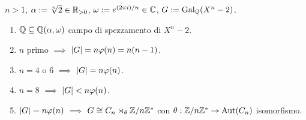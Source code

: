 \begin{eser}
$n>1$, $\alpha:=\sqrt[n]{2}\in\R_{>0}$, $\omega:=e^{(2\pi i)/n}\in\C$, $G:=\Gal[\Q]{X^n-2}$.
\begin{enumerate}
\item $\Q\subseteq\Q(\alpha,\omega)$ campo di spezzamento di $X^n-2$.
\item $n$ primo $\implies$ $\card{G}=n\varphi(n)=n(n-1)$.
\item $n=4$ o $6$ $\implies$ $\card{G}=n\varphi(n)$.
\item $n=8$ $\implies$ $\card{G}<n\varphi(n)$.
\item $\card{G}=n\varphi(n)$ $\implies$ $G\iso C_n\rtimes_{\theta}\Z/n\Z^*$ con $\theta : \Z/n\Z^*\to\Aut(C_n)$ isomorfismo.
\end{enumerate}
\end{eser}

